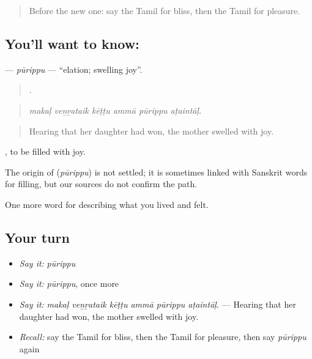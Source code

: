 \label{lesson:TA-C459-purippu}



\begin{quote}
Before the new one: say the Tamil for bliss, then the Tamil for pleasure.
\end{quote}

\subsection*{You'll want to know: }
\textbf{} — \emph{pūrippu} — \textquotedblleft{}elation; swelling joy\textquotedblright{}.

\begin{quote}
     .
\end{quote}

\begin{quote}
\emph{makaḷ veṉṟataik kēṭṭu ammā pūrippu aṭaintāḷ.}
\end{quote}

\begin{quote}
Hearing that her daughter had won, the mother swelled with joy.
\end{quote}

 , to be filled with joy.

\begin{cousinweb}
The origin of \textbf{} (\emph{pūrippu}) is not settled; it is sometimes linked with Sanskrit words for filling, but our sources do not confirm the path.
\end{cousinweb}

\begin{grammarlens}[title={What you've built}]
One more word for describing what you lived and felt.
\end{grammarlens}

\subsection*{Your turn}
\begin{itemize}
\raggedright
  \item \emph{Say it:} \emph{pūrippu}
  \item \emph{Say it:} \emph{pūrippu}, once more
  \item \emph{Say it:} \emph{makaḷ veṉṟataik kēṭṭu ammā pūrippu aṭaintāḷ.} — Hearing that her daughter had won, the mother swelled with joy.
  \item \emph{Recall:} say the Tamil for bliss, then the Tamil for pleasure, then say \emph{pūrippu} again
\end{itemize}

